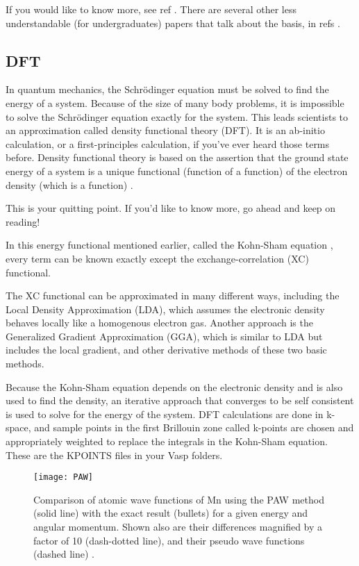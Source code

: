 \documentclass{article}
\begin{document}
If you would like to know more, see ref
\cite{gubaev2019accelerating}. There are several other less
understandable (for undergraduates) papers that talk about the basis,
in refs \cite{podryabinkin2017active,gubaev2018machine,
  shapeev2016moment}. 


\subsection{DFT}
In quantum mechanics, the Schr\"{o}dinger equation must be solved to
find the energy of a system. Because of the size of many body
problems, it is impossible to solve the Schr\"{o}dinger equation
exactly for the system. This leads scientists to an approximation
called density functional theory (DFT). It is an ab-initio
calculation, or a first-principles calculation, if you've ever heard
those terms before. Density functional theory is based on the
assertion that the ground state energy of a system is a unique
functional (function of a function) of the electron density (which is
a function) \cite{PhysRev.136.B864}.

This is your quitting point. If you'd like to know more, go ahead and
keep on reading!

In this energy functional mentioned earlier, called the Kohn-Sham
equation \cite{kohn1965self}, every term can be known exactly except
the exchange-correlation (XC) functional.  

The XC functional can be approximated in many different ways,
including the Local Density Approximation (LDA), which assumes the
electronic density behaves locally like a homogenous electron
gas. Another approach is the Generalized Gradient Approximation (GGA),
which is similar to LDA but includes the local gradient, and other
derivative methods of these two basic methods.

Because the Kohn-Sham equation depends on the electronic density and
is also used to find the density, an iterative approach that
converges to be self consistent is used to solve for the energy of the
system.  DFT calculations are done in k-space, and sample points in
the first Brillouin zone called k-points are chosen and appropriately
weighted to replace the integrals in the Kohn-Sham equation. These are
the KPOINTS files in your Vasp folders.

\begin{figure}
  \texttt{[image: PAW]}
  \caption{Comparison of atomic wave functions of Mn using the PAW
    method (solid line) with the exact result (bullets) for a given
    energy and angular momentum. Shown also are their differences
    magnified by a factor of 10 (dash-dotted line), and their pseudo
    wave functions (dashed line) \cite{PhysRevB.50.17953}. }
  \label{fig:MnPAW}
\end{figure} 
\end{document}
